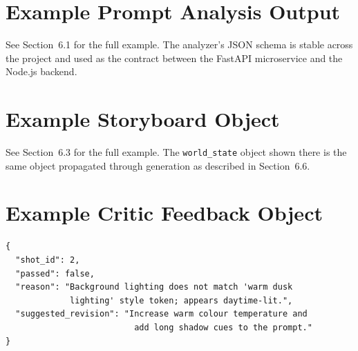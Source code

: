 \documentclass[11pt,a4paper]{article}
\begin{document}
\appendix

\section{Example Prompt Analysis Output}
See Section~6.1 for the full example. The analyzer's JSON schema is stable across the project and used as the contract between the FastAPI microservice and the Node.js backend.

\section{Example Storyboard Object}
See Section~6.3 for the full example. The \texttt{world\_state} object shown there is the same object propagated through generation as described in Section~6.6.

\section{Example Critic Feedback Object}

\begin{verbatim}
{
  "shot_id": 2,
  "passed": false,
  "reason": "Background lighting does not match 'warm dusk
             lighting' style token; appears daytime-lit.",
  "suggested_revision": "Increase warm colour temperature and
                          add long shadow cues to the prompt."
}
\end{verbatim}
\end{document}
